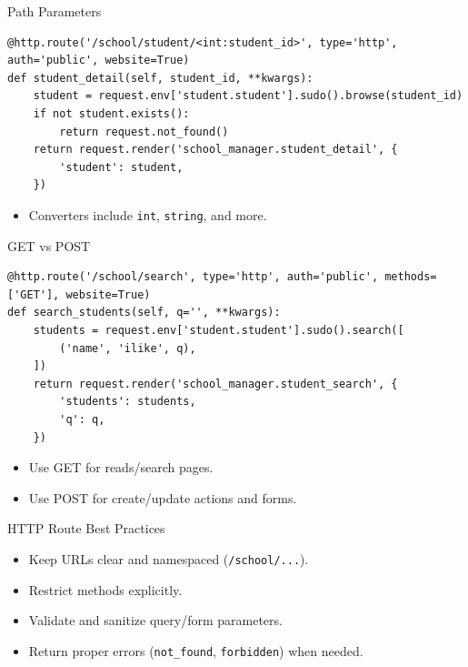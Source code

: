 \begin{frame}[fragile]{Path Parameters}
\begin{lstlisting}
@http.route('/school/student/<int:student_id>', type='http', auth='public', website=True)
def student_detail(self, student_id, **kwargs):
	student = request.env['student.student'].sudo().browse(student_id)
	if not student.exists():
		return request.not_found()
	return request.render('school_manager.student_detail', {
		'student': student,
	})
\end{lstlisting}
	\begin{itemize}
		\item Converters include \texttt{int}, \texttt{string}, and more.
	\end{itemize}
\end{frame}

\begin{frame}[fragile]{GET vs POST}
\begin{lstlisting}
@http.route('/school/search', type='http', auth='public', methods=['GET'], website=True)
def search_students(self, q='', **kwargs):
	students = request.env['student.student'].sudo().search([
		('name', 'ilike', q),
	])
	return request.render('school_manager.student_search', {
		'students': students,
		'q': q,
	})
\end{lstlisting}
	\begin{itemize}
		\item Use GET for reads/search pages.
		\item Use POST for create/update actions and forms.
	\end{itemize}
\end{frame}

\begin{frame}{HTTP Route Best Practices}
	\begin{itemize}
		\item Keep URLs clear and namespaced (\texttt{/school/...}).
		\item Restrict methods explicitly.
		\item Validate and sanitize query/form parameters.
		\item Return proper errors (\texttt{not\_found}, \texttt{forbidden}) when needed.
	\end{itemize}
\end{frame}
